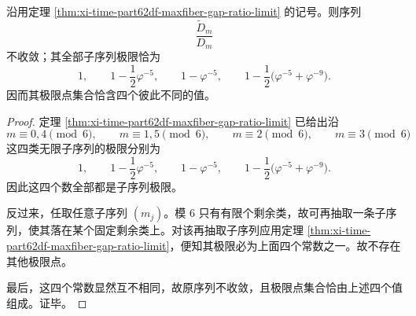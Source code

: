 \begin{corollary}\label{cor:xi-time-part62df-maxfiber-ratio-nonconvergence-mod6}
沿用定理 \ref{thm:xi-time-part62df-maxfiber-gap-ratio-limit} 的记号。则序列
\[
\frac{\widetilde D_m}{D_m}
\]
不收敛；其全部子序列极限恰为
\[
1,\qquad
1-\frac{1}{2}\varphi^{-5},\qquad
1-\varphi^{-5},\qquad
1-\frac{1}{2}\bigl(\varphi^{-5}+\varphi^{-9}\bigr).
\]
因而其极限点集合恰含四个彼此不同的值。
\end{corollary}
\begin{proof}
定理 \ref{thm:xi-time-part62df-maxfiber-gap-ratio-limit} 已给出沿
\[
m\equiv 0,4\pmod 6,\qquad
m\equiv 1,5\pmod 6,\qquad
m\equiv 2\pmod 6,\qquad
m\equiv 3\pmod 6
\]
这四类无限子序列的极限分别为
\[
1,\qquad
1-\frac{1}{2}\varphi^{-5},\qquad
1-\varphi^{-5},\qquad
1-\frac{1}{2}\bigl(\varphi^{-5}+\varphi^{-9}\bigr).
\]
因此这四个数全部都是子序列极限。

反过来，任取任意子序列 \((m_j)\)。模 \(6\) 只有有限个剩余类，故可再抽取一条子序列，使其落在某个固定剩余类上。对该再抽取子序列应用定理 \ref{thm:xi-time-part62df-maxfiber-gap-ratio-limit}，便知其极限必为上面四个常数之一。故不存在其他极限点。

最后，这四个常数显然互不相同，故原序列不收敛，且极限点集合恰由上述四个值组成。证毕。
\end{proof}

